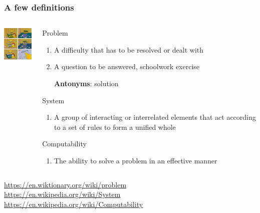 \documentclass[xcolor=x11names]{beamer}
\newcommand{\light}[1]{\textcolor{gray}{#1}}
\begin{document}
\begin{frame}
\frametitle{A few definitions}
\begin{columns}
\begin{column}{0.2\textwidth}
 \includegraphics[width=23mm]{img/homer_marketing.png}
\end{column}												\pause

\begin{column}{0.8\textwidth}

\alert{Problem}
\begin{enumerate}
 \item A difficulty that has to be resolved or dealt with
 \item A question to be answered, schoolwork exercise	\pause

	\textbf{Antonyms}: solution
\end{enumerate}											\pause

\alert{System}
\begin{enumerate}
 \item A group of interacting or interrelated elements that act according to a
set of rules to form a unified whole
\end{enumerate}											\pause

\alert{Computability}
\begin{enumerate}
 \item The ability to solve a problem in an effective manner
\end{enumerate}

\end{column}
\end{columns}
\bigskip

\onslide
\footnotesize
\light{%
\url{https://en.wiktionary.org/wiki/problem}	\\
\url{https://en.wikipedia.org/wiki/System}	\\
\url{https://en.wikipedia.org/wiki/Computability}
}
\end{frame}
\end{document}

